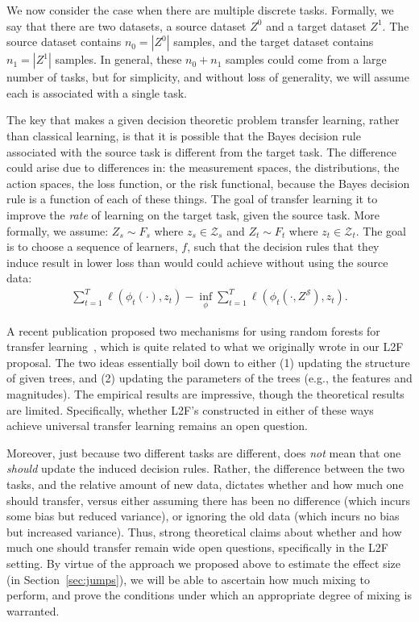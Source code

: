\documentclass{article}
\begin{document}
We now consider the case when there are multiple discrete tasks.  Formally, we say that there are two datasets, a source dataset $Z^\mathcal{0}$ and a target dataset $Z^\mathcal{1}$. The source dataset contains $n_0 = | Z^\mathcal{0}|$ samples, and the target dataset contains $n_1 = |Z^\mathcal{1}|$ samples. In general, these $n_0+n_1$ samples could come from a large number of tasks, but for simplicity, and without loss of generality, we will assume each is associated with a single task. 

The key that makes a given decision theoretic problem transfer learning, rather than classical learning, is that it is possible that the Bayes decision rule associated with the source task is different from the target task.  The difference could arise due to differences in: the measurement spaces, the distributions, the action spaces, the loss function, or the risk functional, because the Bayes decision rule is a function of each of these things.  The goal of transfer learning it to improve the \emph{rate} of learning on the target task, given the source task. More formally, we assume:
$Z_s \sim F_s$ where $z_s \in \mathcal{Z}_s$ and 
$Z_t \sim F_t$ where $z_t \in \mathcal{Z}_t$. 
The goal is to choose a sequence of learners, $f$, such that the decision rules that they induce result in lower loss than would could achieve without using the source data:
\begin{align}
    \sum_{t=1}^T \ell(\phi_t( \cdot), z_t)    - \inf_{\phi} \sum_{t=1}^T \ell(\phi_t( \cdot, Z^\mathcal{S}), z_t).
\end{align}

A recent publication proposed two mechanisms for using random forests for transfer learning~\cite{Segev2016}, which is quite related to what we originally wrote in our L2F proposal. The two ideas essentially boil down to either (1) updating the structure of given trees, and (2) updating the parameters of the trees (e.g., the features and magnitudes).  The empirical results are impressive, though the theoretical results are limited.  Specifically, whether L2F's constructed in either of these ways achieve universal transfer learning remains an open question.  

Moreover, just because two different tasks are different, does \emph{not} mean that one \emph{should} update the induced decision rules.  Rather, the difference between the two tasks, and the relative amount of new data, dictates whether and how much one should transfer, versus either assuming there has been no difference (which incurs some bias but reduced variance), or ignoring the old data (which incurs no bias but increased variance).  Thus, strong theoretical claims about whether and how much one should transfer remain wide open questions, specifically in the L2F setting.  By virtue of the approach we proposed above to estimate the effect size (in Section~\ref{sec:jumps}), we will be able to ascertain how much mixing to perform, and prove the conditions under which an appropriate degree of mixing is warranted. 
\end{document}
